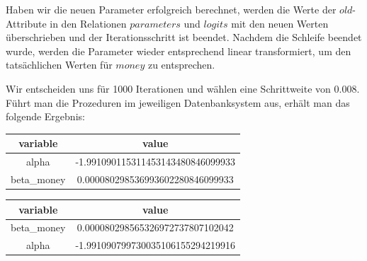 Haben wir die neuen Parameter erfolgreich berechnet, werden die Werte der $old$-Attribute in den Relationen $parameters$ und $logits$ mit den neuen Werten überschrieben und der Iterationsschritt ist beendet. Nachdem die Schleife beendet wurde, werden die Parameter wieder entsprechend linear transformiert, um den tatsächlichen Werten für $money$ zu entsprechen.

Wir entscheiden uns für 1000 Iterationen und wählen eine Schrittweite von $0.008$. Führt man die Prozeduren im jeweiligen Datenbanksystem aus, erhält man das folgende Ergebnis:

\begin{center}
  \begin{tabular}{|c|c|}\hline
    \textbf{variable} & \textbf{value} \\ \hline
    alpha & -1.991090115311453143480846099933 \\ \hline
    beta\_money & 0.000080298536993602280846099933 \\ \hline
  \end{tabular}
  \pagebreak
  \begin{tabular}{|c|c|}\hline
    \textbf{variable} & \textbf{value} \\ \hline
    beta\_money & 0.000080298565326972737807102042 \\ \hline
    alpha & -1.991090799730035106155294219916 \\ \hline
  \end{tabular}
\end{center}
